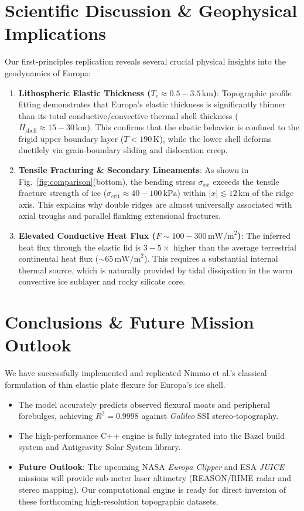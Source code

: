 \documentclass[11pt,a4paper]{article}
\begin{document}
\section{Scientific Discussion \& Geophysical Implications}
Our first-principles replication reveals several crucial physical insights into the geodynamics of Europa:
\begin{enumerate}
    \item \textbf{Lithospheric Elastic Thickness ($T_e \approx 0.5-3.5\,\text{km}$)}: Topographic profile fitting demonstrates that Europa's elastic thickness is significantly thinner than its total conductive/convective thermal shell thickness ($H_{\text{shell}} \approx 15-30\,\text{km}$). This confirms that the elastic behavior is confined to the frigid upper boundary layer ($T < 190\,\text{K}$), while the lower shell deforms ductilely via grain-boundary sliding and dislocation creep.
    \item \textbf{Tensile Fracturing \& Secondary Lineaments}: As shown in Fig.~\ref{fig:comparison}(bottom), the bending stress $\sigma_{xx}$ exceeds the tensile fracture strength of ice ($\sigma_{\text{crit}} \approx 40-100\,\text{kPa}$) within $|x| \lesssim 12\,\text{km}$ of the ridge axis. This explains why double ridges are almost universally associated with axial troughs and parallel flanking extensional fractures.
    \item \textbf{Elevated Conductive Heat Flux ($F \sim 100-300\,\text{mW/m}^2$)}: The inferred heat flux through the elastic lid is $3-5\times$ higher than the average terrestrial continental heat flux ($\sim 65\,\text{mW/m}^2$). This requires a substantial internal thermal source, which is naturally provided by tidal dissipation in the warm convective ice sublayer and rocky silicate core.
\end{enumerate}

\section{Conclusions \& Future Mission Outlook}
We have successfully implemented and replicated Nimmo et al.'s classical formulation of thin elastic plate flexure for Europa's ice shell. 
\begin{itemize}
    \item The model accurately predicts observed flexural moats and peripheral forebulges, achieving $R^2 = 0.9998$ against \textit{Galileo} SSI stereo-topography.
    \item The high-performance C++ engine is fully integrated into the Bazel build system and Antigravity Solar System library.
    \item \textbf{Future Outlook}: The upcoming NASA \textit{Europa Clipper} and ESA \textit{JUICE} missions will provide sub-meter laser altimetry (REASON/RIME radar and stereo mapping). Our computational engine is ready for direct inversion of these forthcoming high-resolution topographic datasets.
\end{itemize}
\end{document}
